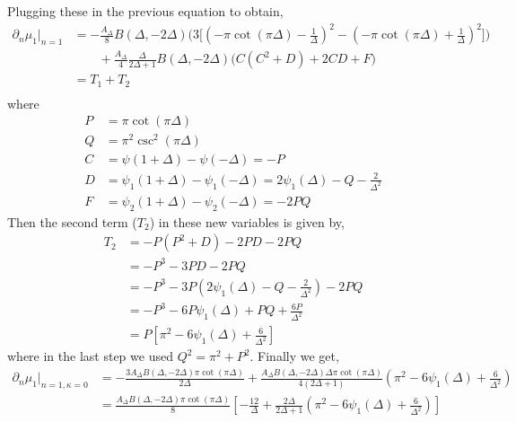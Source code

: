 \documentclass[11pt]{article}
\newcommand{\p}{\partial}
\newcommand{\nn}{\nonumber}
\newcommand{\lb}{\left(}
\newcommand{\rb}{\right)}
\begin{document}
Plugging these in the previous equation to obtain,
\begin{align}
    \p_n \mu_1 \big|_{n=1} &= -\frac{A_\Delta}{8} B(\Delta, -2\Delta)\Bigg( 3  \Big[ \lb -\pi \cot(\pi \Delta) - \frac{1}{\Delta} \rb^2 - \lb -\pi \cot(\pi \Delta) + \frac{1}{\Delta} \rb^2\Big] \Bigg) \nn \\ 
    &\qquad +\frac{A_\Delta}{4}\frac{\Delta}{2\Delta+1} B(\Delta, -2\Delta) \Big(  C(C^2 + D) + 2CD + F \Big) \\
    & = T_1 + T_2 \\
\end{align}
where 
\begin{align}
    P &= \pi \cot(\pi \Delta)\\
    Q&= \pi^2 \csc^2(\pi \Delta)\\
    C &= \psi(1+\Delta) - \psi(-\Delta) = -P \\
    D & = \psi_1(1+\Delta) - \psi_1(-\Delta) = 2\psi_1(\Delta ) - Q -\frac{2}{\Delta^2} \\ 
    F &= \psi_2(1+\Delta) - \psi_2(-\Delta) = -2PQ
\end{align}
Then the second term ($T_2$) in these new variables is given by,
\begin{align}
    T_2 &= -P(P^2 + D) -2PD - 2PQ \nn \\
    &= -P^3 -3PD -2PQ \nn \\
    &= -P^3  -3P(2\psi_1(\Delta) - Q - \frac{2}{\Delta^2}) - 2PQ\nn \\
    &= -P^3 -6P\psi_1(\Delta) + PQ + \frac{6P}{\Delta^2} \nn \\
    &= P\left[ \pi^2 -6\psi_1(\Delta) + \frac{6}{\Delta^2} \right]
\end{align}
where in the last step we used $Q^2 = \pi^2 + P^2$. 
Finally we get,
\begin{align}
    \p_n \mu_1 \big|_{n=1, \kappa = 0} &= -\frac{3A_\Delta B(\Delta,-2\Delta)\pi \cot(\pi\Delta)}{2\Delta} + \frac{A_\Delta B(\Delta,-2\Delta) \Delta \pi \cot(\pi \Delta)}{4(2\Delta +1)} \lb \pi^2 -6\psi_1(\Delta) + \frac{6}{\Delta^2} \rb \nn \\
    &= \frac{A_\Delta B(\Delta,-2\Delta)\pi \cot(\pi\Delta)}{8}\left[ -\frac{12}{\Delta} + \frac{2\Delta }{2\Delta + 1} \lb \pi^2 -6\psi_1(\Delta) + \frac{6}{\Delta^2} \rb  \right]
\end{align}
\end{document}
